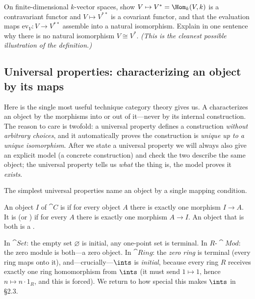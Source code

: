 \documentclass[11pt]{article}
\begin{document}
\begin{xca}
On finite-dimensional $k$-vector spaces, show $V\mapsto V^{*}=\Hom_k(V,k)$ is a contravariant
functor and $V\mapsto V^{**}$ is a covariant functor, and that the evaluation maps
$\mathrm{ev}_V\colon V\to V^{**}$ assemble into a natural isomorphism. Explain in one
sentence why there is no natural isomorphism $V\cong V^{*}$. \emph{(This is the cleanest
possible illustration of the definition.)}
\end{xca}

\subsection{Universal properties: characterizing an object by its maps}

Here is the single most useful technique category theory gives us. A  characterizes an object by the morphisms into or out of it---never by its internal
construction. The reason to care is twofold: a universal property defines a construction
\emph{without arbitrary choices}, and it automatically proves the construction is
\emph{unique up to a unique isomorphism}. After we state a universal property we will always
also give an explicit model (a concrete construction) and check the two describe the same
object; the universal property tells us \emph{what} the thing is, the model proves it
\emph{exists}.

The simplest universal properties name an object by a single mapping condition.

\begin{ddefinition}
An object $I$ of $\cat{C}$ is  if for every object $A$ there is exactly one
morphism $I\to A$. It is  (or ) if for every $A$ there is
exactly one morphism $A\to I$. An object that is both is a .
\end{ddefinition}

\begin{eexample}
In $\cat{Set}$: the empty set $\varnothing$ is initial, any one-point set is terminal. In
$R\text{-}\cat{Mod}$: the zero module is both---a zero object. In $\cat{Ring}$: the
\emph{zero ring} is terminal (every ring maps onto it), and---crucially---$\ints$ is
\emph{initial}, because every ring $R$ receives exactly one ring homomorphism from $\ints$
(it must send $1\mapsto 1$, hence $n\mapsto n\cdot 1_R$, and this is forced). We return to
how special this makes $\ints$ in \S2.3.
\end{eexample}
\end{document}
